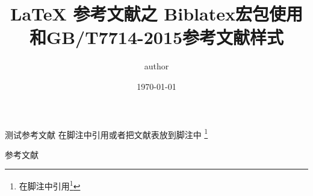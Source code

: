 \documentclass[xcolor=svgnames]{beamer}
\title{\LaTeX{} 参考文献之 \newline
Biblatex宏包使用和GB/T7714-2015参考文献样式}
\author{author}
\date{\today}
\begin{document}
\begin{frame}[plain]
  \titlepage
\end{frame}

\begin{frame}{测试参考文献}
在脚注中引用或者把文献表放到脚注中
\footnote{在脚注中引用\footcite{傅刚2000--}}
\end{frame}

\begin{frame}{参考文献}
\printbibliography[heading=bibliography,title=参考文献]
\end{frame}
\end{document}
